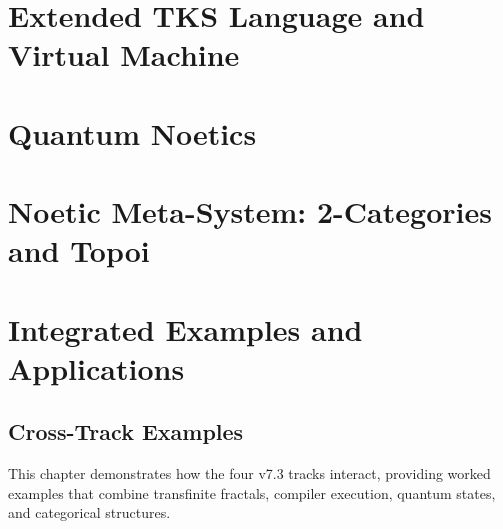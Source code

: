 \documentclass[11pt,twoside,openright]{book}
\theoremstyle{definition}
\theoremstyle{plain}
\theoremstyle{remark}
\begin{document}
\part{Extended TKS Language and Virtual Machine}
\label{part:compiler-track}



\part{Quantum Noetics}
\label{part:quantum-track}



\part{Noetic Meta-System: 2-Categories and Topoi}
\label{part:meta-track}



\part{Integrated Examples and Applications}
\label{part:integrated}

\chapter{Cross-Track Examples}
\label{ch:cross-track-examples}

\begin{tcolorbox}[colback=green!5!white,colframe=green!75!black,title=\textbf{Integration Chapter}]
This chapter demonstrates how the four v7.3 tracks interact, providing worked examples that combine transfinite fractals, compiler execution, quantum states, and categorical structures.
\end{tcolorbox}
\end{document}
